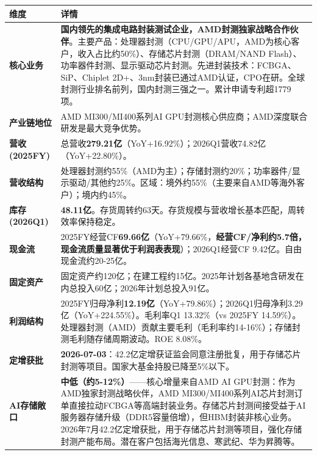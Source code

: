 \begin{exhibitbox}
\centering
\scriptsize
\renewcommand{\arraystretch}{1.20}
\begin{tabularx}{\exhibitboxwidth}{>{\bfseries}p{2.2cm} >{\raggedright\arraybackslash\sloppy\hspace{0pt}}X}
\toprule
\textbf{维度} & \textbf{详情} \\
\midrule
核心业务 & \textbf{国内领先的集成电路封装测试企业，AMD封测独家战略合作伙伴}。主要产品：处理器封测（CPU/GPU/APU，AMD为核心客户，收入占比约50\%）、存储芯片封测（DRAM/NAND Flash）、功率器件封测、显示驱动芯片封测。先进封装技术：FCBGA、SiP、Chiplet 2D+、3nm封装已通过AMD认证，CPO在研。全球封测行业排名前列，国内封测三强之一。累计申请专利超1779项。 \\
产业链地位 & AMD MI300/MI400系列AI GPU封测核心供应商；AMD深度联合研发是最大竞争优势。 \\
营收(2025FY) & 总营收\textbf{279.21亿}（YoY+16.92\%）；2026Q1营收74.82亿（YoY+22.80\%）。 \\
营收结构 & 处理器封测约55\%（AMD为主）；存储封测约20\%；功率器件/显示驱动/其他约25\%。区域：境外约55\%（主要来自AMD等海外客户）；境内约45\%。 \\
库存(2026Q1) & \textbf{48.11亿}。存货周转约63天。存货规模与营收增长基本匹配，周转效率保持稳定。 \\
现金流 & 2025FY经营CF\textbf{69.66亿}（YoY+79.66\%，\textbf{经营CF/净利约5.7倍，现金流质量显著优于利润表表现}）；2026Q1经营CF 9.42亿。自由现金流约20-25亿。 \\
固定资产 & 固定资产约120亿；在建工程约15亿。2025年计划各基地含研发在内总投入60亿；2026年计划总投入91亿。 \\
利润结构 & 2025FY归母净利\textbf{12.19亿}（YoY+79.86\%）；2026Q1归母净利3.29亿（YoY+224.55\%）。毛利率Q1 13.32\%（vs 2025FY 14.59\%）。处理器封测（AMD）贡献主要毛利（毛利率约14-16\%）；存储封测毛利随存储周期波动。ROE 8.08\%。 \\
\midrule
\rowcolor{riskgreen!8}
\textbf{定增获批} & \textbf{2026-07-03}：42.2亿定增获证监会同意注册批复，用于存储芯片封测等项目。国家大基金持股已降至5\%以下。 \\
\midrule
AI存储敞口 & \textbf{中低（约5-12\%）}——核心增量来自AMD AI GPU封测：作为AMD独家封测战略伙伴，AMD MI300/MI400系列AI芯片封测订单直接拉动FCBGA等高端封装业务。存储芯片封测间接受益于AI服务器存储升级（DDR5容量倍增），但HBM封装非核心业务。2026年7月42.2亿定增获批，用于存储芯片封测等项目，强化存储封测产能布局。潜在客户包括海光信息、寒武纪、华为昇腾等。 \\
\bottomrule
\end{tabularx}
\end{exhibitbox}

